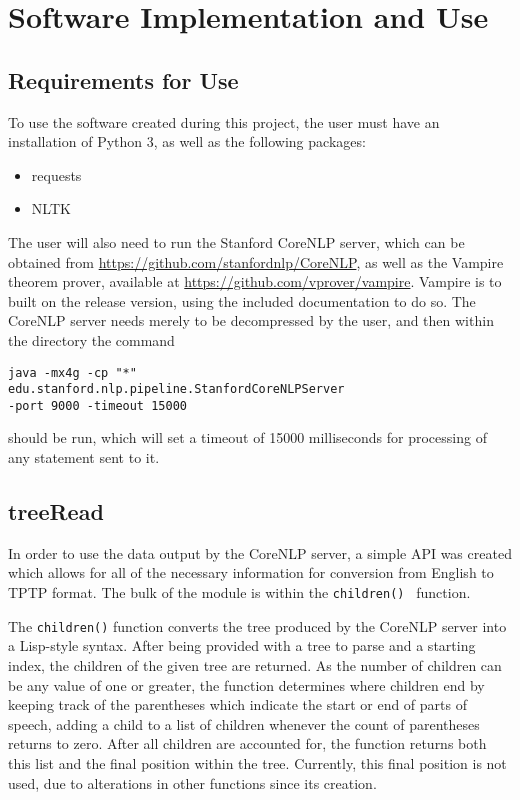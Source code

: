 \chapter{Software Implementation and Use}

\section{Requirements for Use}

To use the software created during this project, the user must have an installation of Python 3, as well as the following packages:
\begin{itemize}
\item requests
\item NLTK
\end{itemize}

The user will also need to run the Stanford CoreNLP server, which can be obtained from \url{https://github.com/stanfordnlp/CoreNLP}, as well as the Vampire theorem prover, available at \url{https://github.com/vprover/vampire}. Vampire is to built on the release version, using the included documentation to do so. The CoreNLP server needs merely to be decompressed by the user, and then within the directory the command
\begin{verbatim}
java -mx4g -cp "*"
edu.stanford.nlp.pipeline.StanfordCoreNLPServer
-port 9000 -timeout 15000
\end{verbatim}
should be run, which will set a timeout of 15000 milliseconds for processing of any statement sent to it.

\section{treeRead}

In order to use the data output by the CoreNLP server, a simple API was created which allows for all of the necessary information for conversion from English to TPTP format. The bulk of the module is within the \texttt{children() } function.

The \texttt{children()} function converts the tree produced by the CoreNLP server into a Lisp-style syntax. After being provided with a tree to parse and a starting index, the children of the given tree are returned. As the number of children can be any value of one or greater, the function determines where children end by keeping track of the parentheses which indicate the start or end of parts of speech, adding a child to a list of children whenever the count of parentheses returns to zero. After all children are accounted for, the function returns both this list and the final position within the tree. Currently, this final position is not used, due to alterations in other functions since its creation.

